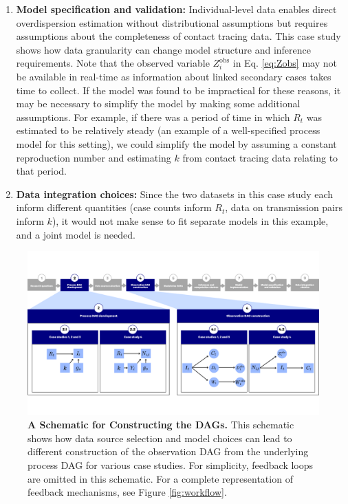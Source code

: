 \documentclass{article}
\begin{document}
\begin{enumerate}
    \item \textbf{Model specification and validation:} Individual-level data enables direct overdispersion estimation without distributional assumptions but requires assumptions about the completeness of contact tracing data. This case study shows how data granularity can change model structure and inference requirements. Note that the observed variable $Z^\mathrm{obs}_i$ in Eq. \eqref{eq:Zobs} may not be available in real-time as information about linked secondary cases takes time to collect. If the model was found to be impractical for these reasons, it may be necessary to simplify the model by making some additional assumptions. For example, if there was a period of time in which $R_t$ was estimated to be relatively steady (an example of a well-specified process model for this setting), we could simplify the model by assuming a constant reproduction number and estimating $k$ from contact tracing data relating to that period. 

    \item \textbf{Data integration choices:} Since the two datasets in this case study each inform different quantities (case counts inform $R_t$, data on transmission pairs inform $k$), it would not make sense to fit separate models in this example, and a joint model is needed. 
\end{enumerate}




\begin{figure}[htbp]
    \centering
    \includegraphics[width=\textwidth]{figures/Abbott et al figure 7.png}
    \caption{\textbf{A Schematic for Constructing the DAGs.} This schematic shows how data source selection and model choices can lead to different construction of the observation \ac{DAG} from the underlying process DAG for various case studies. For simplicity, feedback loops are omitted in this schematic. For a complete representation of feedback mechanisms, see Figure \ref{fig:workflow}.}
    \label{fig:case_study_diagram}
\end{figure}
\end{document}
